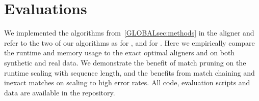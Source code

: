 \section{Evaluations} \label{GLOBALsec:evals}

We implemented the algorithms from~\cref{GLOBALsec:methods} in the aligner \astarpa
and refer to the two of our algorithms as \SH for \sh, and \CSH for \csh. Here
we empirically compare the runtime and memory usage to the exact optimal
aligners \edlib and \wfa on both synthetic and real data. We demonstrate the
benefit of match pruning on the runtime scaling with sequence length, and the
benefits from match chaining and inexact matches on scaling to high error rates.
All code, evaluation scripts and data are available in the \astarpa repository.


%








